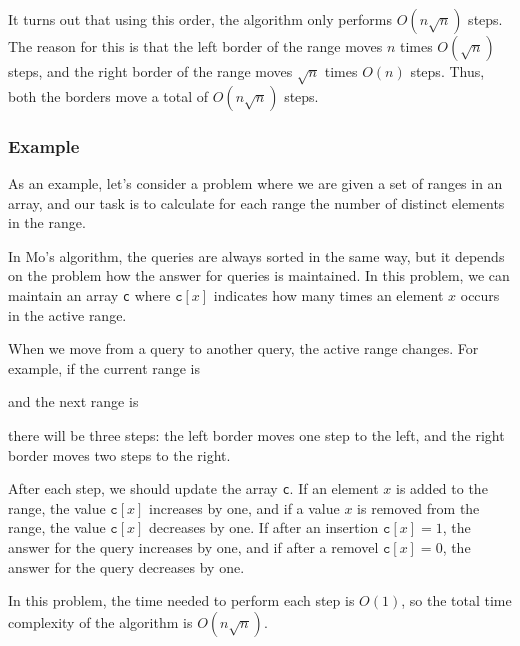 It turns out that using this order, the algorithm
only performs $O(n \sqrt n)$ steps.
The reason for this is that the left border of
the range moves $n$ times $O(\sqrt n)$ steps,
and the right border of the range moves
$\sqrt n$ times $O(n)$ steps. Thus, both the
borders move a total of $O(n \sqrt n)$ steps.

\subsubsection*{Example}

As an example, let's consider a problem
where we are given a set of ranges in an array,
and our task is to calculate for each range
the number of distinct elements in the range.

In Mo's algorithm, the queries are always sorted
in the same way, but it depends on the problem
how the answer for queries is maintained.
In this problem, we can maintain an array 
\texttt{c} where $\texttt{c}[x]$
indicates how many times an element $x$
occurs in the active range.

When we move from a query to another query,
the active range changes.
For example, if the current range is
\begin{center}
\end{center}
and the next range is
\begin{center}
\end{center}
there will be three steps:
the left border moves one step to the left,
and the right border moves two steps to the right.

After each step, we should update the
array \texttt{c}.
If an element $x$ is added to the range,
the value
$\texttt{c}[x]$ increases by one,
and if a value $x$ is removed from the range,
the value $\texttt{c}[x]$ decreases by one.
If after an insertion
$\texttt{c}[x]=1$,
the answer for the query increases by one,
and if after a removel $\texttt{c}[x]=0$,
the answer for the query decreases by one.

In this problem, the time needed to perform
each step is $O(1)$, so the total time complexity
of the algorithm is $O(n \sqrt n)$.


